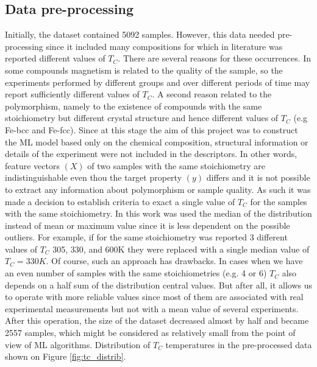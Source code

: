 \subsection{Data pre-processing}

\label{section:Data pre-processing}
Initially, the dataset contained 5092 samples. However, this data needed pre-processing since it included many compositions for which in literature was reported different values of $T_C$. There are several reasons for these occurrences. In some compounds magnetism is related to the quality of the sample, so the experiments performed by different groups and over different periods of time may report sufficiently different values of $T_C$. A second reason related to the polymorphism, namely to the existence of compounds with the same stoichiometry but different crystal structure and hence different values of $T_C$ (e.g Fe-bcc and Fe-fcc). Since at this stage the aim of this project was to construct the ML model based only on the chemical composition, structural information or details of the experiment were not included in the descriptors. In other words, feature vectors $(X)$ of two samples with the same stoichiometry are indistinguishable even thou the target property $(y)$ differs and it is not possible to extract any information about polymorphism or sample quality.
As such it was made a decision to establish criteria to exact a single value of $T_C$ for the samples with the same stoichiometry. In this work was used the median of the distribution instead of mean or maximum value since it is less dependent on the possible outliers. For example, if for the same stoichiometry was reported 3 different values of $T_C$ 305, 330, and 600K they were replaced with a single median value of $T_C = 330 K$. Of course, such an approach has drawbacks. In cases when we have an even number of samples with the same stoichiometries (e.g. 4 or 6) $T_C$ also depends on a half sum of the distribution central values. But after all, it allows us to operate with more reliable values since most of them are associated with real experimental measurements but not with a mean value of several experiments. After this operation, the size of the dataset decreased almost by half and became 2557 samples, which might be considered as relatively small from the point of view of ML algorithms. Distribution of $T_C$ temperatures in the pre-processed data shown on Figure \ref{fig:tc_distrib}.

